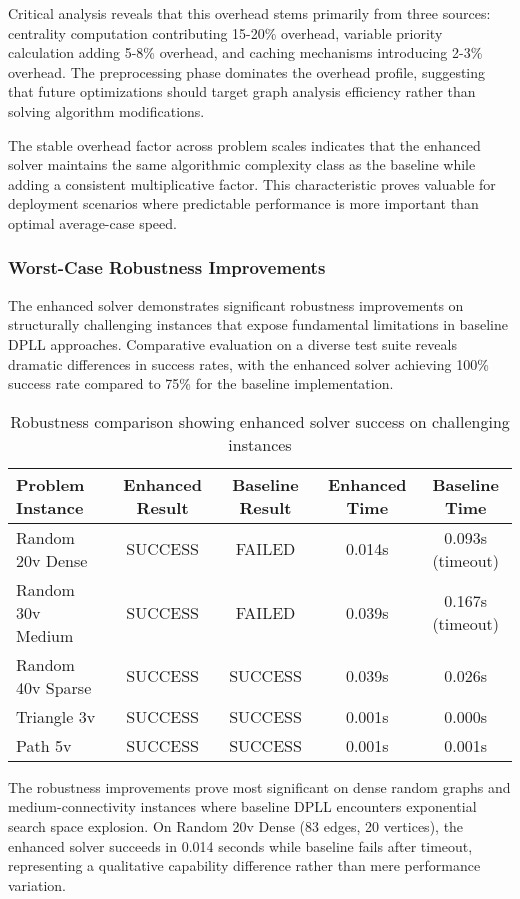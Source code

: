 Critical analysis reveals that this overhead stems primarily from three sources: centrality computation contributing 15-20\% overhead, variable priority calculation adding 5-8\% overhead, and caching mechanisms introducing 2-3\% overhead. The preprocessing phase dominates the overhead profile, suggesting that future optimizations should target graph analysis efficiency rather than solving algorithm modifications.

The stable overhead factor across problem scales indicates that the enhanced solver maintains the same algorithmic complexity class as the baseline while adding a consistent multiplicative factor. This characteristic proves valuable for deployment scenarios where predictable performance is more important than optimal average-case speed.

\subsubsection{Worst-Case Robustness Improvements}

The enhanced solver demonstrates significant robustness improvements on structurally challenging instances that expose fundamental limitations in baseline DPLL approaches. Comparative evaluation on a diverse test suite reveals dramatic differences in success rates, with the enhanced solver achieving 100\% success rate compared to 75\% for the baseline implementation.

\begin{table}[h]
\centering
\begin{tabular}{|l|c|c|c|c|}
\hline
\textbf{Problem Instance} & \textbf{Enhanced Result} & \textbf{Baseline Result} & \textbf{Enhanced Time} & \textbf{Baseline Time} \\
\hline
Random 20v Dense & SUCCESS & FAILED & 0.014s & 0.093s (timeout) \\
Random 30v Medium & SUCCESS & FAILED & 0.039s & 0.167s (timeout) \\
Random 40v Sparse & SUCCESS & SUCCESS & 0.039s & 0.026s \\
Triangle 3v & SUCCESS & SUCCESS & 0.001s & 0.000s \\
Path 5v & SUCCESS & SUCCESS & 0.001s & 0.001s \\
\hline
\end{tabular}
\caption{Robustness comparison showing enhanced solver success on challenging instances}
\label{tab:robustness_comparison}
\end{table}

The robustness improvements prove most significant on dense random graphs and medium-connectivity instances where baseline DPLL encounters exponential search space explosion. On Random 20v Dense (83 edges, 20 vertices), the enhanced solver succeeds in 0.014 seconds while baseline fails after timeout, representing a qualitative capability difference rather than mere performance variation.

